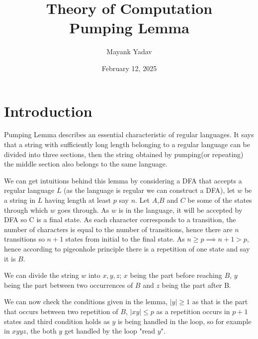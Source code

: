 \documentclass{article}
\title{ \large Theory of Computation  \\ \LARGE  Pumping Lemma}
\author{Mayank Yadav}
\date{February 12, 2025}
\begin{document}
\maketitle


\section{Introduction}
Pumping Lemma describes an essential characteristic of regular languages. It says that a string with sufficiently long length belonging to a regular language can be divided into three sections, then the string obtained by pumping(or repeating) the middle section also belongs to the same language.

\begin{center}
\end{center}

We can get intuitions behind this lemma by considering a DFA that accepts a regular language $L$ (as the language is regular we can construct a DFA), let $w$ be a string in $L$ having length at least $p$ say $n$. Let $A$,$B$ and $C$ be some of the states through which $w$ goes through. As $w$ is in the language, it will be accepted by DFA so C is a final state. As each character corresponds to a transition, the number of characters is equal to the number of transitions, hence there are $n$ transitions so $n+1$ states from initial to the final state. As $n\ge p\implies n+1>p$, hence according to pigeonhole principle there is a repetition of one state and say it is $B$. 

We can divide the string $w$ into $x,y,z$; $x$ being the part before reaching $B$, $y$ being the part between two occurrences of $B$ and $z$ being the part after B.

We can now check the conditions given in the lemma, $\mid y\mid\ge 1$ as that is the part that occurs between two repetition of $B$, $\mid xy\mid \le p$ as a repetition occurs in $p+1$ states and third condition holds as $y$ is being handled in the loop, so for example in $xyyz$, the both $y$ get handled by the loop "read $y$".
\end{document}
